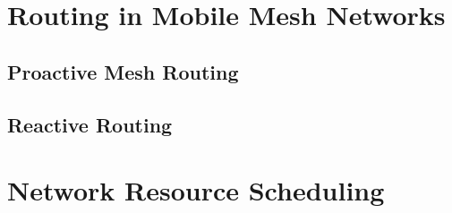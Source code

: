 

\section{Routing in Mobile Mesh Networks}

\subsection{Proactive Mesh Routing}


            

\subsection{Reactive Routing}



\section{Network Resource Scheduling}

